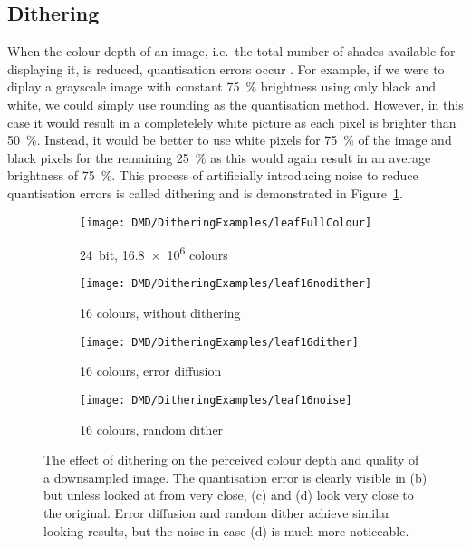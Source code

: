 \subsection*{Dithering}
When the colour depth of an image, i.e.\ the total number of shades available for displaying it, is reduced, quantisation errors occur \cite{funkhouser:2000}. For example, if we were to diplay a grayscale image with constant \SI{75}{\percent} brightness using only black and white, we could simply use rounding as the quantisation method. However, in this case it would result in a completelely white picture as each pixel is brighter than \SI{50}{\percent}. Instead, it would be better to use white pixels for \SI{75}{\percent} of the image and black pixels for the remaining \SI{25}{\percent} as this would again result in an average brightness of \SI{75}{\percent}. This process of artificially introducing noise to reduce quantisation errors is called dithering and is demonstrated in Figure~\ref{fig:dmd_dithering_example}. 
\begin{figure}[htbp]
    \centering
    \begin{subfigure}[t]{0.24\linewidth}
        \texttt{[image: DMD/DitheringExamples/leafFullColour]}
        \caption{\SI{24}{bit}, \num{16.8e6} colours}
    \end{subfigure}
    \begin{subfigure}[t]{0.24\linewidth}
        \texttt{[image: DMD/DitheringExamples/leaf16nodither]}
        \caption{16 colours, without dithering}
    \end{subfigure}
    \begin{subfigure}[t]{0.24\linewidth}
        \texttt{[image: DMD/DitheringExamples/leaf16dither]}
        \caption{16 colours, error diffusion}
    \end{subfigure}
    \begin{subfigure}[t]{0.24\linewidth}
        \texttt{[image: DMD/DitheringExamples/leaf16noise]}
        \caption{16 colours, random dither}
    \end{subfigure}
    \caption[The effect of dithering on the perceived colour depth and quality of a downsampled image]{The effect of dithering on the perceived colour depth and quality of a downsampled image. The quantisation error is clearly visible in (b) but unless looked at from very close, (c) and (d) look very close to the original. Error diffusion and random dither achieve similar looking results, but the noise in case (d) is much more noticeable.\protect\footnotemark}
    \label{fig:dmd_dithering_example}
\end{figure}
